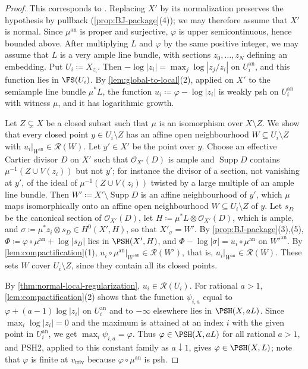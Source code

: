 \documentclass[11pt,a4paper]{article}
\newcommand{\an}{\mathrm{an}}          %
\newcommand{\vtriv}{v_{\mathrm{triv}}} %
\begin{document}
\begin{proof}
This corresponds to \cite[Theorem~6.5]{Wu26}. Replacing $X'$ by its normalization preserves the hypothesis by pullback (\cref{prop:BJ-package}(4)); we may therefore assume that $X'$ is normal. Since $\mu^{\an}$ is proper and surjective, $\varphi$ is upper semicontinuous, hence bounded above. After multiplying $L$ and $\varphi$ by the same positive integer, we may assume that $L$ is a very ample line bundle, with sections $z_0,\ldots,z_N$ defining an embedding. Put $U_i\coloneqq X_{z_i}$. Then $-\log|z_i|=\max_j\log|z_j/z_i|$ on $U_i^{\an}$, and this function lies in $\FS(U_i)$. By \cref{lem:global-to-local}(2), applied on $X'$ to the semiample line bundle $\mu^*L$, the function $u_i\coloneqq\varphi-\log|z_i|$ is weakly psh on $U_i^{\an}$ with witness $\mu$, and it has logarithmic growth.

Let $Z\subsetneq X$ be a closed subset such that $\mu$ is an isomorphism over $X\setminus Z$. We show that every closed point $y\in U_i\setminus Z$ has an affine open neighbourhood $W\subseteq U_i\setminus Z$ with $u_i|_{W^{\an}}\in\mathcal{R}(W)$. Let $y'\in X'$ be the point over $y$. Choose an effective Cartier divisor $D$ on $X'$ such that $\mathcal O_{X'}(D)$ is ample and $\operatorname{Supp}D$ contains $\mu^{-1}(Z\cup V(z_i))$ but not $y'$; for instance the divisor of a section, not vanishing at $y'$, of the ideal of $\mu^{-1}(Z\cup V(z_i))$ twisted by a large multiple of an ample line bundle. Then $W'\coloneqq X'\setminus\operatorname{Supp}D$ is an affine neighbourhood of $y'$, which $\mu$ maps isomorphically onto an affine open neighbourhood $W\subseteq U_i\setminus Z$ of $y$. Let $s_D$ be the canonical section of $\mathcal O_{X'}(D)$, let $H\coloneqq\mu^*L\otimes\mathcal O_{X'}(D)$, which is ample, and $\sigma\coloneqq\mu^*z_i\otimes s_D\in H^0(X',H)$, so that $X'_\sigma=W'$. By \cref{prop:BJ-package}(3),(5), $\Phi\coloneqq\varphi\circ\mu^{\an}+\log|s_D|$ lies in $\PSH(X',H)$, and $\Phi-\log|\sigma|=u_i\circ\mu^{\an}$ on $W'^{\an}$. By \cref{lem:compactification}(1), $u_i\circ\mu^{\an}|_{W'^{\an}}\in\mathcal{R}(W')$, that is, $u_i|_{W^{\an}}\in\mathcal{R}(W)$. These sets $W$ cover $U_i\setminus Z$, since they contain all its closed points.

By \cref{thm:normal-local-regularization}, $u_i\in\mathcal{R}(U_i)$. For rational $a>1$, \cref{lem:compactification}(2) shows that the function $\psi_{i,a}$ equal to $\varphi+(a-1)\log|z_i|$ on $U_i^{\an}$ and to $-\infty$ elsewhere lies in $\PSH(X,aL)$. Since $\max_i\log|z_i|=0$ and the maximum is attained at an index $i$ with the given point in $U_i^{\an}$, we get $\max_i\psi_{i,a}=\varphi$. Thus $\varphi\in\PSH(X,aL)$ for all rational $a>1$, and PSH2, applied to this constant family as $a\downarrow1$, gives $\varphi\in\PSH(X,L)$; note that $\varphi$ is finite at $\vtriv$ because $\varphi\circ\mu^{\an}$ is psh.
\end{proof}
\end{document}
